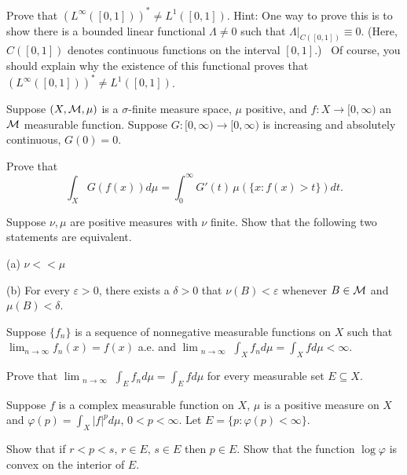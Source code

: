 \documentclass[bbb]{report}
\begin{document}
\begin{large}
\begin{description}
\vspace{.05in}

\item[4.]
Prove that $(L^\infty([0,1]))^* \neq L^1([0,1]).$
Hint: One way to prove this is to show there is a bounded linear
functional $\Lambda\neq 0$
such that $\Lambda |_{C([0,1])} \equiv 0$. (Here, $C([0,1])$ denotes
continuous functions on the interval $[0,1].$)  \ Of course, you should
explain why the existence of this functional proves that
$(L^\infty([0,1]))^* \neq L^1([0,1])$.

\vspace{.05in}

\item[5.] Suppose 
$(X,{\cal M}, \mu)$ is a $\sigma$-finite measure space, $\mu$ positive,
and $f:X \to [0,
\infty)$
an ${\cal M}$
measurable function. Suppose $G: [0, \infty) \to [0, \infty)$ is 
increasing and  absolutely continuous, $G(0)=0$.

Prove that
$$\int_X G(f(x)) d \mu = \int^\infty_0 G' (t) \, \mu (\{x : f(x) >
t\}) dt.$$

\vspace{.05in}

\item[6.]
Suppose $\nu, \mu$ are positive measures with $\nu$ finite.  Show that the
following two
statements are equivalent.

\item[\quad] (a)
$\nu << \mu$

\item[\quad] (b)
For every $\varepsilon > 0$, there exists a $\delta>0$ that $\nu(B) <
\varepsilon$ whenever
$B \in {\cal M}$ and $\mu (B) < \delta$.

\vspace{.05in}

\item[7.]
Suppose $\{f_n\}$ is a  sequence of nonnegative measurable functions on
$X$
such that \linebreak
$\lim_{n \to \infty} f_ n(x) = f(x)$ a.e. and
$\lim_{\substack {n \to \infty}} \int_X f_n d \mu = \int_X fd \mu <
\infty$.

Prove that $\lim_{\substack {n \to \infty}} \int_E f_n  d \mu = \int_E f d
\mu$
for every measurable set $E \subseteq X$.

\vspace{.05in}

\item[8.]
Suppose $f$ is a complex measurable function on $X$, $\mu$ is a positive
measure on $X$ and $\varphi (p) = \int_X |f|^p d \mu$,
$0 < p < \infty$. Let $E = \{p : \varphi (p) < \infty \}$.

Show that if $r < p < s,\,  r \in E, \, s \in E$ then $p \in E.$  Show
that the function  $\log \varphi$ is convex on the interior of $E$.

\vfill

\end{description}

\end{large}
\end{document}
